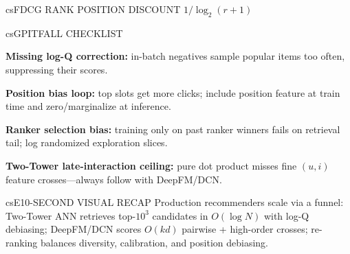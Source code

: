 \documentclass[../../../../master.tex]{subfiles}
\begin{document}
\begin{cscolumns}
\begin{cscard}{csF}{DCG RANK POSITION DISCOUNT $1/\log_2(r+1)$}
  \centering
\end{cscard}
\columnbreak

\begin{cscard}{csG}{PITFALL CHECKLIST}
  \begin{csbul}
    \item \textbf{Missing log-Q correction:} in-batch negatives sample popular items too often, suppressing their scores.
    \item \textbf{Position bias loop:} top slots get more clicks; include position feature at train time and zero/marginalize at inference.
    \item \textbf{Ranker selection bias:} training only on past ranker winners fails on retrieval tail; log randomized exploration slices.
    \item \textbf{Two-Tower late-interaction ceiling:} pure dot product misses fine $(u,i)$ feature crosses—always follow with DeepFM/DCN.
  \end{csbul}
\end{cscard}

\begin{cscard}{csE}{10-SECOND VISUAL RECAP}
  \sffamily\footnotesize
  Production recommenders scale via a funnel: Two-Tower ANN retrieves top-$10^3$ candidates in $O(\log N)$ with log-Q debiasing; DeepFM/DCN scores $O(kd)$ pairwise + high-order crosses; re-ranking balances diversity, calibration, and position debiasing.
\end{cscard}
\end{cscolumns}

\csend
\end{document}
